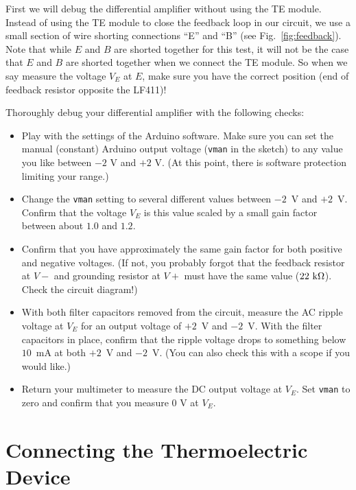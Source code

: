 \documentclass[12pt]{article}
\begin{document}
First we will debug the differential amplifier without using the TE module.
Instead of using the TE module to close the feedback loop in our circuit, we use
a small section of wire shorting connections ``E'' and ``B'' (see
Fig.~\ref{fig:feedback}).  Note that while $E$ and $B$ are shorted together for
this test, it will not be the case that $E$ and $B$ are shorted together when we
connect the TE module.  So when we say measure the voltage $V_E$ at $E$, make
sure you have the correct position (end of feedback resistor opposite the
LF411)!

Thoroughly debug your differential amplifier with the following checks:

\begin{itemize}

\item Play with the settings of the Arduino software.  Make sure you can set the
  manual (constant) Arduino output voltage ({\tt vman} in the sketch) to any
  value you like between $-2$ V and $+2$ V. (At this point, there is software
  protection limiting your range.)

\item Change the {\tt vman} setting to several different values between $-2$~V
  and $+2$~V.  Confirm that the voltage $V_E$ is this
  value scaled by a small gain factor between about $1.0$ and $1.2$.

\item Confirm that you have approximately the same gain factor for both positive
  and negative voltages.  (If not, you probably forgot that the feedback
  resistor at $V-$ and grounding resistor at $V+$ must have the same value
  ($22~\rm{k\Omega}$).  Check the circuit diagram!)

\item With both filter capacitors removed from the circuit, measure the AC
  ripple voltage at $V_E$ for an output voltage of $+2$~V and $-2$~V.
  With the filter capacitors in place, confirm that the ripple voltage drops to
  something below $10$~mA at both $+2$~V and $-2$~V.  (You can also check this
  with a scope if you would like.)

\item Return your multimeter to measure the DC output voltage at $V_E$.  Set
  {\tt vman} to zero and confirm that you measure 0 V at $V_E$.

\end{itemize}



\section{Connecting the Thermoelectric Device}
\end{document}

